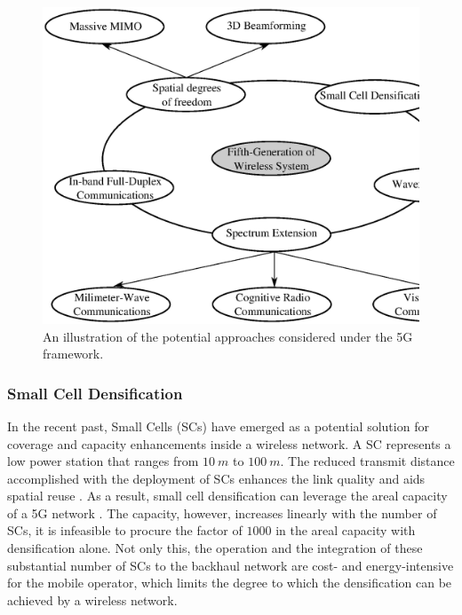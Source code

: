 \begin{figure}
\centering
\includegraphics[width = 0.98 \columnwidth]{figures/5G}
\caption{An illustration of the potential approaches considered under the 5G framework.}
\label{fig_Int:5G}
\end{figure}


\subsubsection*{Small Cell Densification}

In the recent past, Small Cells (SCs) have emerged as a potential solution for coverage and capacity enhancements inside a wireless network. A SC represents a low power station that ranges from $\SI{10}{m}$ to $\SI{100}{m}$. The reduced transmit distance accomplished with the deployment of SCs enhances the link quality and aids spatial reuse \cite{Chander08}.
As a result, small cell densification can leverage the areal capacity of a 5G network \cite{Andrews14}. The capacity, however, increases linearly with the number of SCs, it is infeasible to procure the factor of $1000$ in the areal capacity with densification alone. Not only this, the operation and the integration of these substantial number of SCs to the backhaul network are cost- and energy-intensive for the mobile operator, which limits the degree to which the densification can be achieved by a wireless network.






